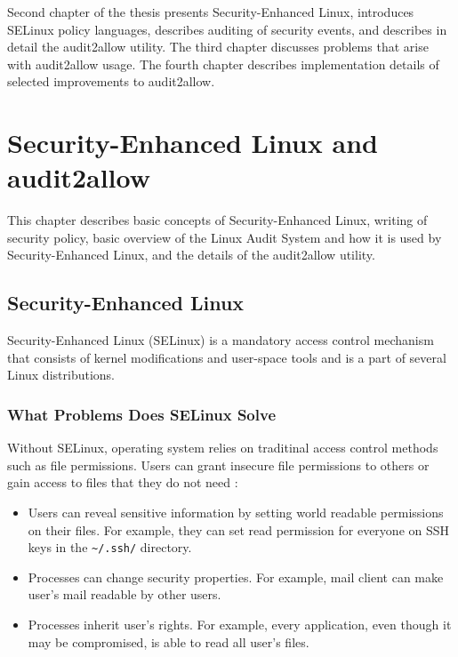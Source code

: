 Second chapter of the thesis presents Security-Enhanced Linux, introduces
SELinux policy languages, describes auditing of security events, and describes
in detail the audit2allow utility. The third chapter discusses problems that
arise with audit2allow usage. The fourth chapter describes implementation
details of selected improvements to audit2allow.

\chapter{Security-Enhanced Linux and audit2allow}

This chapter describes basic concepts of Security-Enhanced Linux, writing of
security policy, basic overview of the Linux Audit System and how it is used by
Security-Enhanced Linux, and the details of the audit2allow utility.

\section{Security-Enhanced Linux}

Security-Enhanced Linux (SELinux) is a mandatory access control mechanism that
consists of kernel modifications and user-space tools and is a part of several
Linux distributions.

\subsection{What Problems Does SELinux Solve}
Without SELinux, operating system relies on traditinal access control methods
such as file permissions. Users can grant insecure file permissions to others or
gain access to files that they do not need \cite{selinuxguide}:
\begin{itemize}
    \item Users can reveal sensitive information by setting world readable
        permissions on their files. For example, they can set read permission
        for everyone on SSH keys in the \texttt{\textasciitilde/.ssh/}
        directory.
    \item Processes can change security properties. For example, mail client can
        make user's mail readable by other users.
    \item Processes inherit user's rights. For example, every application, even
        though it may be compromised, is able to read all user's files.
\end{itemize}

